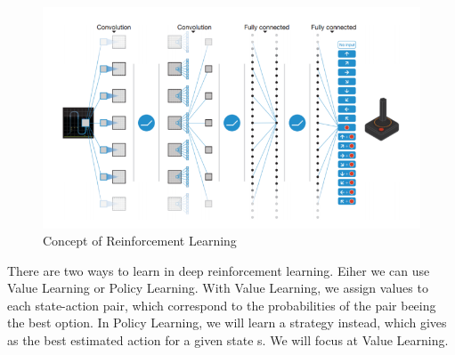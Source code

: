		\begin{figure}[h!]
			\begin{center}
				\includegraphics[width=\linewidth]{img/v2-67ef75bb7f5e67b2a42645aa821894bf_hd.png}
				\caption{Concept of Reinforcement Learning}
				\label{concept}
			\end{center}
		\end{figure}

		There are two ways to learn in deep reinforcement learning. Eiher we can use Value Learning or Policy Learning. With Value Learning, we assign values to each state-action pair, which correspond to the probabilities of the pair beeing the best option. In Policy Learning, we will learn a strategy instead, which gives as the best estimated action for a given state s. We will focus at Value Learning. 
			
